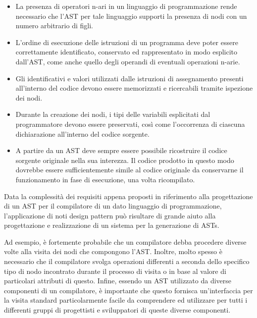 \begin{itemize}

\item La presenza di operatori n-ari in un linguaggio di programmazione rende
necessario che l’AST per tale linguaggio supporti la presenza di nodi con un
numero arbitrario di figli.

\item L’ordine di esecuzione delle istruzioni di un programma deve poter essere
correttamente identificato, conservato ed rappresentato in modo esplicito
dall’AST, come anche quello degli operandi di eventuali operazioni n-arie.

\item Gli identificativi e valori utilizzati dalle istruzioni di assegnamento
presenti all’interno del codice devono essere memorizzati e ricercabili tramite
ispezione dei nodi.

\item Durante la creazione dei nodi, i tipi delle variabili esplicitati dal
programmatore devono essere preservati, così come l'occorrenza di ciascuna
dichiarazione all’interno del codice sorgente.

\item A partire da un AST deve sempre essere possibile ricostruire il codice
sorgente originale nella sua interezza. Il codice prodotto in questo modo
dovrebbe essere sufficientemente simile al codice originale da conservarne il
funzionamento in fase di esecuzione, una volta ricompilato.

\end{itemize}

Data la complessità dei requisiti appena proposti in riferimento alla
progettazione di un AST per il compilatore di un dato linguaggio di
programmazione, l’applicazione di noti design pattern può risultare di grande
aiuto alla progettazione e  realizzazione di un sistema per la generazione di
ASTs.

Ad esempio, è fortemente probabile che un compilatore debba procedere diverse
volte alla visita dei nodi che compongono l’AST. Inoltre, molto spesso è
necessario che il compilatore svolga operazioni differenti a seconda dello
specifico tipo di nodo incontrato durante il processo di visita o in base al
valore di particolari attributi di questo. Infine, essendo un AST utilizzato da
diverse componenti di un compilatore, è importante che questo fornisca
un’interfaccia per la visita standard particolarmente facile da comprendere ed
utilizzare per tutti i differenti gruppi di progettisti e sviluppatori di queste
diverse componenti.

